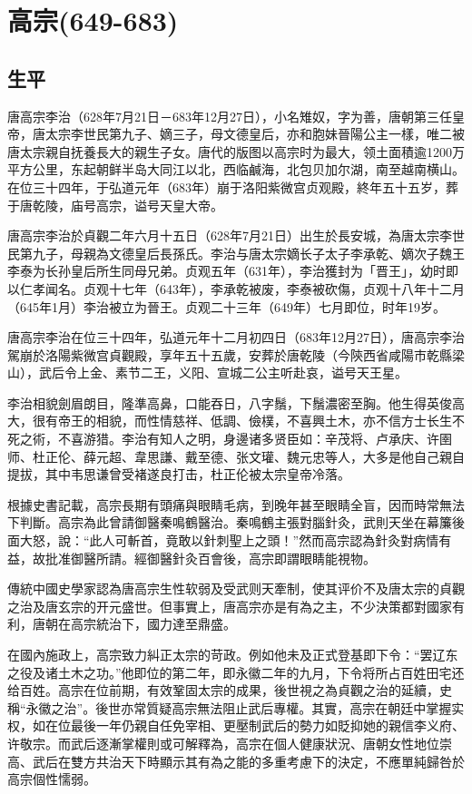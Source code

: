 
\section{高宗\tiny(649-683)}

\subsection{生平}

唐高宗李治（628年7月21日－683年12月27日），小名雉奴，字为善，唐朝第三任皇帝，唐太宗李世民第九子、嫡三子，母文德皇后，亦和胞妹晉陽公主一樣，唯二被唐太宗親自抚養長大的親生子女。唐代的版图以高宗时为最大，领土面積逾1200万平方公里，东起朝鲜半岛大同江以北，西临鹹海，北包贝加尔湖，南至越南横山。在位三十四年，于弘道元年（683年）崩于洛阳紫微宫贞观殿，終年五十五岁，葬于唐乾陵，庙号高宗，谥号天皇大帝。

唐高宗李治於貞觀二年六月十五日（628年7月21日）出生於長安城，為唐太宗李世民第九子，母親為文德皇后長孫氏。李治与唐太宗嫡长子太子李承乾、嫡次子魏王李泰为长孙皇后所生同母兄弟。贞观五年（631年），李治獲封为「晋王」，幼时即以仁孝闻名。贞观十七年（643年），李承乾被废，李泰被砍傷，贞观十八年十二月（645年1月）李治被立为晉王。贞观二十三年（649年）七月即位，时年19岁。

唐高宗李治在位三十四年，弘道元年十二月初四日（683年12月27日），唐高宗李治駕崩於洛陽紫微宫貞觀殿，享年五十五歲，安葬於唐乾陵（今陝西省咸陽市乾縣梁山），武后令上金、素节二王，义阳、宣城二公主听赴哀，谥号天王星。

李治相貌劍眉朗目，隆準高鼻，口能吞日，八字鬚，下鬚濃密至胸。他生得英俊高大，很有帝王的相貌，而性情慈祥、低調、儉樸，不喜興土木，亦不信方士长生不死之術，不喜游猎。李治有知人之明，身邊诸多贤臣如：辛茂将、卢承庆、许圉师、杜正伦、薛元超、韋思謙、戴至德、张文瓘、魏元忠等人，大多是他自己親自提拔，其中韦思谦曾受褚遂良打击，杜正伦被太宗皇帝冷落。

根據史書記載，高宗長期有頭痛與眼睛毛病，到晚年甚至眼睛全盲，因而時常無法下判斷。高宗為此曾請御醫秦鳴鶴醫治。秦鳴鶴主張對腦針灸，武則天坐在幕簾後面大怒，說：“此人可斬首，竟敢以針刺聖上之頭！”然而高宗認為針灸對病情有益，故批准御醫所請。經御醫針灸百會後，高宗即謂眼睛能視物。

傳統中國史學家認為唐高宗生性软弱及受武则天牽制，使其评价不及唐太宗的貞觀之治及唐玄宗的开元盛世。但事實上，唐高宗亦是有為之主，不少決策都對國家有利，唐朝在高宗統治下，國力達至鼎盛。

在國內施政上，高宗致力糾正太宗的苛政。例如他未及正式登基即下令：“罢辽东之役及诸土木之功。”他即位的第二年，即永徽二年的九月，下令将所占百姓田宅还给百姓。高宗在位前期，有效鞏固太宗的成果，後世視之為貞觀之治的延續，史稱“永徽之治”。後世亦常質疑高宗無法阻止武后專權。其實，高宗在朝廷中掌握实权，如在位最後一年仍親自任免宰相、更壓制武后的勢力如貶抑她的親信李义府、许敬宗。而武后逐漸掌權則或可解釋為，高宗在個人健康狀況、唐朝女性地位崇高、武后在雙方共治天下時顯示其有為之能的多重考慮下的決定，不應單純歸咎於高宗個性懦弱。

